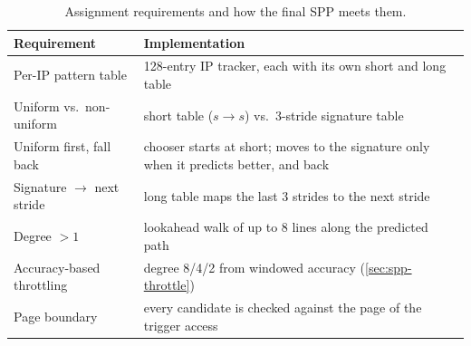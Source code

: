 \documentclass[12pt, a4paper]{article}
\newcommand{\tablesetup}{\small\renewcommand{\arraystretch}{1.15}\setlength{\tabcolsep}{4pt}}
\newcommand{\colhead}[1]{\textbf{#1}}
\begin{document}
\begin{table}[htbp]
\centering
\caption{Assignment requirements and how the final SPP meets them.}\label{tab:spp-req}
\tablesetup
\begin{tabularx}{\linewidth}{lL}
\toprule
{}\colhead{Requirement} & \colhead{Implementation} \\
\midrule
Per-IP pattern table & 128-entry IP tracker, each with its own short and long table \\
Uniform vs.\ non-uniform & short table ($s\to s$) vs.\ 3-stride signature table \\
Uniform first, fall back & chooser starts at short; moves to the signature only when it predicts better, and back \\
Signature $\to$ next stride & long table maps the last 3 strides to the next stride \\
Degree $>1$ & lookahead walk of up to 8 lines along the predicted path \\
Accuracy-based throttling & degree 8/4/2 from windowed accuracy (\cref{sec:spp-throttle}) \\
Page boundary & every candidate is checked against the page of the trigger access \\
\bottomrule
\end{tabularx}
\end{table}
\end{document}
